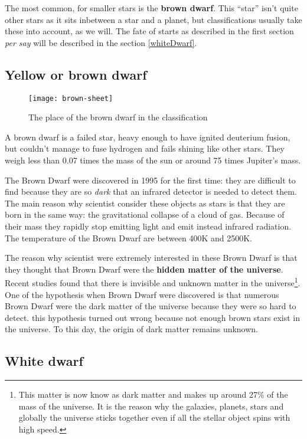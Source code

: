 \documentclass[a4paper, 11pt]{article} %
\begin{document}
The most common, for smaller stars is the \textbf{brown dwarf}. This ``star'' isn't quite other stars as it sits inbetween a star and a planet, but classifications usually take these into account, as we will. The fate of starts as described in the first section \textit{per say} will be described in the section \ref{whiteDwarf}.

\subsection{Yellow or brown dwarf}

\begin{figure}[h]
\centering
\texttt{[image: brown-sheet]}
\caption{The place of the brown dwarf in the classification }
\end{figure}

A brown dwarf is a failed star, heavy enough to have ignited deuterium fusion, but couldn't manage to fuse hydrogen and fails shining like other stars. They weigh less than 0.07 times the mass of the sun or around 75 times Jupiter's mass.


The Brown Dwarf were discovered in 1995 for the first time: they are difficult to find because they are so \textit{dark} that an infrared detector is needed to detect them. 
The main reason why scientist consider these objects as stars is that they are born in the same way: the gravitational collapse of a cloud of gas. Because of their mass they rapidly stop emitting light and emit instead infrared radiation. The temperature of the Brown Dwarf are between 400K and 2500K. 


The reason why scientist were extremely interested in these Brown Dwarf is that they thought that Brown Dwarf were the \textbf{hidden matter of the universe}. Recent studies found that there is invisible and unknown matter in the universe\footnote{ This matter is now know as dark matter and makes up around 27\% of the mass of the universe. It is the reason why the galaxies, planets, stars and globally the universe sticks together even if all the stellar object spins with high speed.}. One of the hypothesis when Brown Dwarf were discovered is that numerous Brown Dwarf were the dark matter of the universe because they were so hard to detect. this hypothesis turned out wrong because not enough brown stars exist in the universe. To this day, the origin of dark matter remains unknown.


\subsection{White dwarf}
\end{document}
